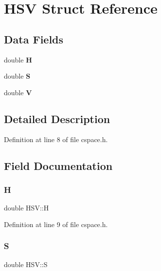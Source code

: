 \hypertarget{struct_h_s_v}{}\section{H\+SV Struct Reference}
\label{struct_h_s_v}
\subsection*{Data Fields}
\begin{DoxyCompactItemize}
\item 
\mbox{\label{struct_h_s_v_aa5298b83b6f6ad2da2f2921c3e3202e7}} 
double {\bfseries H}
\item 
\mbox{\label{struct_h_s_v_a246df45210c6b7c61056158d1596676d}} 
double {\bfseries S}
\item 
\mbox{\label{struct_h_s_v_aade636e6ce581e93de5374f0e5d77d7c}} 
double {\bfseries V}
\end{DoxyCompactItemize}


\subsection{Detailed Description}


Definition at line 8 of file cspace.\+h.



\subsection{Field Documentation}
\mbox{\label{struct_h_s_v_aa5298b83b6f6ad2da2f2921c3e3202e7}} 
\subsubsection{\texorpdfstring{H}{H}}
{\footnotesize\ttfamily double H\+S\+V\+::H}



Definition at line 9 of file cspace.\+h.

\mbox{\label{struct_h_s_v_a246df45210c6b7c61056158d1596676d}} 
\subsubsection{\texorpdfstring{S}{S}}
{\footnotesize\ttfamily double H\+S\+V\+::S}




